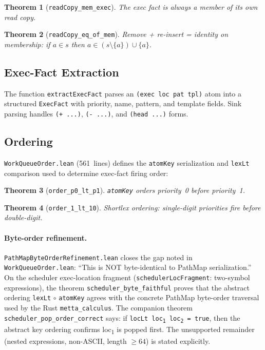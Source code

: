 \documentclass[11pt]{article}
\newtheorem{theorem}{Theorem}[section]
\theoremstyle{definition}
\theoremstyle{remark}
\begin{document}
\begin{theorem}[\texttt{readCopy\_mem\_exec}]
The exec fact is always a member of its own read copy.
\end{theorem}

\begin{theorem}[\texttt{readCopy\_eq\_of\_mem}]
Remove + re-insert = identity on membership: if $a \in s$ then
$a \in (s \setminus \{a\}) \cup \{a\}$.
\end{theorem}

\subsection{Exec-Fact Extraction}

The function \texttt{extractExecFact} parses an \texttt{(exec loc pat tpl)}
atom into a structured \texttt{ExecFact} with priority, name, pattern, and
template fields.  Sink parsing handles \texttt{(+ ...)}, \texttt{(- ...)},
and \texttt{(head ...)} forms.

\subsection{Ordering}

\texttt{WorkQueueOrder.lean} (561~lines) defines the
\texttt{atomKey} serialization and \texttt{lexLt} comparison used to
determine exec-fact firing order:

\begin{theorem}[\texttt{order\_p0\_lt\_p1}]
\texttt{atomKey} orders priority~0 before priority~1.
\end{theorem}

\begin{theorem}[\texttt{order\_1\_lt\_10}]
Shortlex ordering: single-digit priorities fire before double-digit.
\end{theorem}

\paragraph{Byte-order refinement.}
\texttt{PathMapByteOrderRefinement.lean} closes the gap noted in
\texttt{WorkQueueOrder.lean}: ``This is NOT byte-identical to PathMap
serialization.''  On the scheduler exec-location fragment
(\texttt{schedulerLocFragment}: two-symbol expressions), the theorem
\texttt{scheduler\_byte\_faithful} proves that the abstract ordering
\texttt{lexLt} $\circ$ \texttt{atomKey} agrees with the concrete PathMap
byte-order traversal used by the Rust \texttt{metta\_calculus}.
The companion theorem \texttt{scheduler\_pop\_order\_correct} says:
if \texttt{locLt loc\textsubscript{1} loc\textsubscript{2} = true}, then the
abstract key ordering confirms loc\textsubscript{1} is popped first.
The unsupported remainder (nested expressions, non-ASCII, length $\geq 64$)
is stated explicitly.
\end{document}
